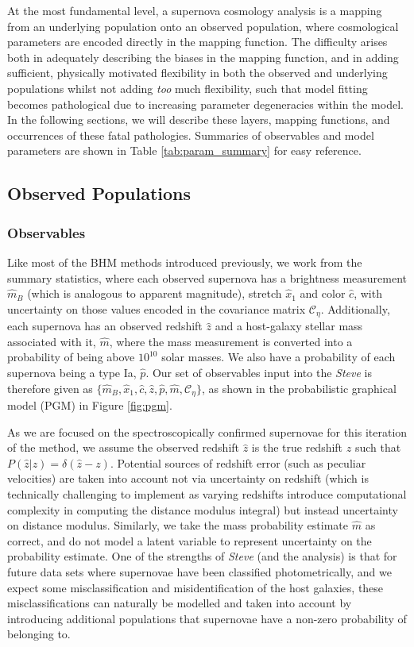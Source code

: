 \documentclass[a4paper,fleqn,usenatbib,manuscript]{emulateapj}
\newcommand{\blue}{\color{blue}}
\newcommand{\cov}{\mathcal{C}_\eta}
\newcommand{\steve}{\textit{Steve}}
\newcommand{\rubin}{\citetalias{Rubin2015}}
\begin{document}
At the most fundamental level, a supernova cosmology analysis is a mapping from an underlying population onto an observed population, where cosmological parameters are encoded directly in the mapping function. The difficulty arises both in adequately describing the biases in the mapping function, and in adding sufficient, physically motivated flexibility in both the observed and underlying populations whilst not adding \textit{too} much flexibility, such that model fitting becomes pathological due to increasing parameter degeneracies within the model. In the following sections, we will describe these layers, mapping functions, and occurrences of these fatal pathologies. Summaries of observables and model parameters are shown in Table \ref{tab:param_summary} for easy reference.


\subsection{Observed Populations}

\subsubsection{Observables}
Like most of the BHM methods introduced previously, we work from the summary statistics, where each observed supernova has a brightness measurement $\hat{m}_B$ (which is analogous to apparent magnitude), stretch $\hat{x}_1$ and color $\hat{c}$, with uncertainty on those values encoded in the covariance matrix $\cov$. Additionally, each supernova has an observed redshift $\hat{z}$ and a host-galaxy stellar mass associated with it, $\hat{m}$, where the mass measurement is converted into a probability of being above $10^{10}$ solar masses. We also have a probability of each supernova being a type Ia, $\hat{p}$. Our set of observables input into the {\steve} is therefore given as $\lbrace \hat{m}_B, \hat{x}_1, \hat{c}, \hat{z}, \hat{p}, \hat{m}, \cov \rbrace$, as shown in the probabilistic graphical model (PGM) in Figure \ref{fig:pgm}.


As we are focused on the spectroscopically confirmed supernovae for this iteration of the method, we assume the observed redshift $\hat{z}$ is the true redshift $z$ such that $P(\hat{z}|z) = \delta(\hat{z} - z)$. Potential sources of redshift error (such as peculiar velocities) are taken into account not via uncertainty on redshift (which is technically challenging to implement {\blue as varying redshifts introduce computational complexity in computing the distance modulus integral}) but instead uncertainty on distance modulus. Similarly, we take the mass probability estimate $\hat{m}$ as correct, and do not model a latent variable to represent uncertainty on the probability estimate. One of the strengths of {\steve} (and the {\rubin} analysis) is that for future data sets where supernovae have been classified photometrically, and we expect some misclassification and misidentification of the host galaxies, these misclassifications can naturally be modelled and taken into account by introducing additional populations that supernovae have a non-zero probability of belonging to.
\end{document}
